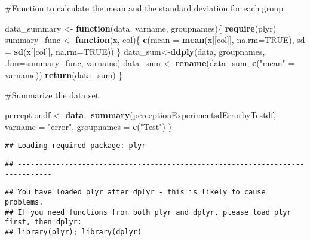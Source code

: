 \documentclass[
]{article}
\newenvironment{Shaded}{\begin{snugshade}}{\end{snugshade}}
\newcommand{\ControlFlowTok}[1]{\textcolor[rgb]{0.13,0.29,0.53}{\textbf{#1}}}
\newcommand{\DataTypeTok}[1]{\textcolor[rgb]{0.13,0.29,0.53}{#1}}
\newcommand{\KeywordTok}[1]{\textcolor[rgb]{0.13,0.29,0.53}{\textbf{#1}}}
\newcommand{\NormalTok}[1]{#1}
\newcommand{\OtherTok}[1]{\textcolor[rgb]{0.56,0.35,0.01}{#1}}
\newcommand{\StringTok}[1]{\textcolor[rgb]{0.31,0.60,0.02}{#1}}
\begin{document}
\#Function to calculate the mean and the standard deviation for each
group

\begin{Shaded}
\begin{Highlighting}[]
\NormalTok{data_summary <-}\StringTok{ }\ControlFlowTok{function}\NormalTok{(data, varname, groupnames)\{}
  \KeywordTok{require}\NormalTok{(plyr)}
\NormalTok{  summary_func <-}\StringTok{ }\ControlFlowTok{function}\NormalTok{(x, col)\{}
    \KeywordTok{c}\NormalTok{(}\DataTypeTok{mean =} \KeywordTok{mean}\NormalTok{(x[[col]], }\DataTypeTok{na.rm=}\OtherTok{TRUE}\NormalTok{),}
      \DataTypeTok{sd =} \KeywordTok{sd}\NormalTok{(x[[col]], }\DataTypeTok{na.rm=}\OtherTok{TRUE}\NormalTok{))}
\NormalTok{  \}}
\NormalTok{  data_sum<-}\KeywordTok{ddply}\NormalTok{(data, groupnames, }\DataTypeTok{.fun=}\NormalTok{summary_func,}
\NormalTok{                  varname)}
\NormalTok{  data_sum <-}\StringTok{ }\KeywordTok{rename}\NormalTok{(data_sum, }\KeywordTok{c}\NormalTok{(}\StringTok{"mean"}\NormalTok{ =}\StringTok{ }\NormalTok{varname))}
 \KeywordTok{return}\NormalTok{(data_sum)}
\NormalTok{\}}
\end{Highlighting}
\end{Shaded}

\#Summarize the data set

\begin{Shaded}
\begin{Highlighting}[]
\NormalTok{perceptiondf <-}\StringTok{ }\KeywordTok{data_summary}\NormalTok{(perceptionExperimentsdErrorbyTestdf, }
                             \DataTypeTok{varname =} \StringTok{"error"}\NormalTok{, }
                             \DataTypeTok{groupnames =} \KeywordTok{c}\NormalTok{(}\StringTok{"Test"}\NormalTok{)}
\NormalTok{                             )}
\end{Highlighting}
\end{Shaded}

\begin{verbatim}
## Loading required package: plyr
\end{verbatim}

\begin{verbatim}
## ------------------------------------------------------------------------------
\end{verbatim}

\begin{verbatim}
## You have loaded plyr after dplyr - this is likely to cause problems.
## If you need functions from both plyr and dplyr, please load plyr first, then dplyr:
## library(plyr); library(dplyr)
\end{verbatim}
\end{document}
